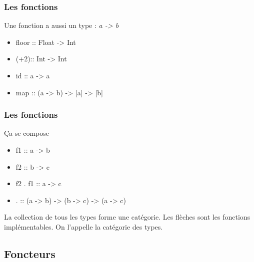 \documentclass{beamer}
\begin{document}
\begin{frame}
\frametitle{Les fonctions}
\begin{block}{Une fonction a aussi un type : \emph{a -> b}}
\begin{itemize}
\item floor   :: Float -> Int
\item (+2):: Int -> Int
\pause
\item id      :: a -> a
\item map :: (a -> b) -> [a] -> [b]
\end{itemize}
\end{block}

\end{frame}


\begin{frame}
\frametitle{Les fonctions}
\begin{block}{Ça se compose}
\begin{itemize}
\item f1 :: a -> b
\item f2 :: b -> c
\item f2 . f1 :: a -> c
\pause
\item . :: (a -> b) -> (b -> c) -> (a -> c)
\end{itemize}
\end{block}
\pause

La collection de tous les types forme une catégorie. Les flèches sont les fonctions implémentables. On l’appelle la catégorie des types.

\end{frame}

\subsection{Foncteurs}
\end{document}
